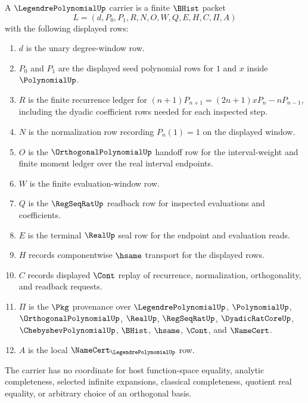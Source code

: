 \begin{definition}
\label{def:legendre-polynomial-carrier}
A $\LegendrePolynomialUp$ carrier is a finite $\BHist$ packet
$$
L=(d,P_0,P_1,R,N,O,W,Q,E,H,C,\Pi,A)
$$
with the following displayed rows:
\begin{enumerate}
\item $d$ is the unary degree-window row.
\item $P_0$ and $P_1$ are the displayed seed polynomial rows for $1$ and $x$ inside $\PolynomialUp$.
\item $R$ is the finite recurrence ledger for $(n+1)P_{n+1}=(2n+1)xP_n-nP_{n-1}$, including the dyadic coefficient rows needed for each inspected step.
\item $N$ is the normalization row recording $P_n(1)=1$ on the displayed window.
\item $O$ is the $\OrthogonalPolynomialUp$ handoff row for the interval-weight and finite moment ledger over the real interval endpoints.
\item $W$ is the finite evaluation-window row.
\item $Q$ is the $\RegSeqRatUp$ readback row for inspected evaluations and coefficients.
\item $E$ is the terminal $\RealUp$ seal row for the endpoint and evaluation reads.
\item $H$ records componentwise $\hsame$ transport for the displayed rows.
\item $C$ records displayed $\Cont$ replay of recurrence, normalization, orthogonality, and readback requests.
\item $\Pi$ is the $\Pkg$ provenance over $\LegendrePolynomialUp$, $\PolynomialUp$, $\OrthogonalPolynomialUp$, $\RealUp$, $\RegSeqRatUp$, $\DyadicRatCoreUp$, $\ChebyshevPolynomialUp$, $\BHist$, $\hsame$, $\Cont$, and $\NameCert$.
\item $A$ is the local $\NameCert_{\LegendrePolynomialUp}$ row.
\end{enumerate}
The carrier has no coordinate for host function-space equality, analytic completeness, selected infinite expansions, classical completeness, quotient real equality, or arbitrary choice of an orthogonal basis.
\end{definition}

